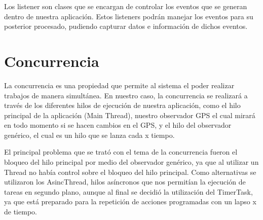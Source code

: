 Los listener son clases que se encargan de controlar los eventos que se generan dentro de nuestra aplicación.
Estos listeners podrán manejar los eventos para su posterior procesado, pudiendo capturar datos e información de dichos eventos.

\section{Concurrencia}
La concurrencia es una propiedad que permite al sistema el poder realizar trabajos de manera simultánea. En nuestro caso, la concurrencia se realizará a través de los diferentes hilos de ejecución de nuestra aplicación, como el hilo principal de la aplicación (Main Thread), nuestro observador GPS el cual mirará en todo momento si se hacen cambios en el GPS, y el hilo del observador genérico, el cual es un hilo que se lanza cada x tiempo.

El principal problema que se trató con el tema de la concurrencia fueron el bloqueo del hilo principal por medio del observador genérico, ya que al utilizar un Thread no había control sobre el bloqueo del hilo principal. Como alternativas se utilizaron los AsincThread, hilos asíncronos que nos permitían la ejecución de tareas en segundo plano, aunque al final se decidió la utilización del TimerTask, ya que está preparado para la repetición de acciones programadas con un lapso x de tiempo.